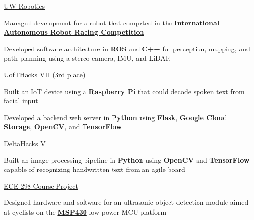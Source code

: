 \documentclass[]{awesome-cv}
\begin{document}
\begin{cventries}
	{\href{https://uwrobotics.uwaterloo.ca/}{UW Robotics}}
	{\begin{cvitems}
		\item {Managed development for a robot that competed in the \href{https://iarrc.org/}{\textbf{International Autonomous Robot Racing Competition}}}
		\item {Developed software architecture in \textbf{ROS} and \textbf{C++} for perception, mapping, and path planning using a stereo camera, IMU, and LiDAR}
	\end{cvitems}}
	{\href{https://devpost.com/software/synviz}{UofTHacks VII (3rd place)}}
	{\begin{cvitems}
		\item {Built an IoT device using a \textbf{Raspberry Pi} that could decode spoken text from facial input}
		\item {Developed a backend web server in \textbf{Python} using \textbf{Flask}, \textbf{Google Cloud Storage}, \textbf{OpenCV}, and \textbf{TensorFlow}}
	\end{cvitems}}
	{\href{https://devpost.com/software/agilite}{DeltaHacks V}}
	{\begin{cvitems}
		\item {Built an image processing pipeline in \textbf{Python} using \textbf{OpenCV} and \textbf{TensorFlow} capable of recognizing handwritten text from an agile board}
	\end{cvitems}}
	{\href{https://uwflow.com/course/ece298}{ECE 298 Course Project}}
	{\begin{cvitems}
		\item {Designed hardware and software for an ultrasonic object detection module aimed at cyclists on the \href{https://www.ti.com/product/MSP430FR4133}{\textbf{MSP430}} low power MCU platform}
	\end{cvitems}}
\end{cventries}
\end{document}
